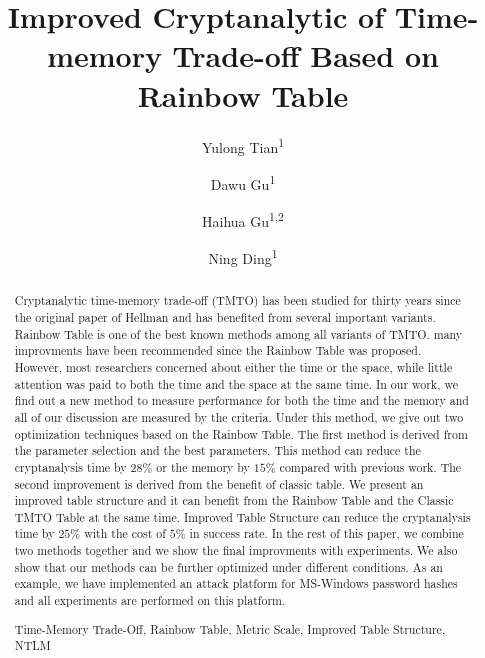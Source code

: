 \documentclass[runningheads,a4paper]{llncs}
\newcommand{\keywords}[1]{\par\addvspace\baselineskip
\noindent\keywordname\enspace\ignorespaces#1}
\begin{document}
\mainmatter  

\title{Improved Cryptanalytic of Time-memory Trade-off Based on Rainbow Table}


\author{Yulong Tian\textsuperscript{1} \and Dawu Gu\textsuperscript{1} \and Haihua Gu\textsuperscript{1,2}\and Ning Ding\textsuperscript{1}}

\maketitle


\begin{abstract}
Cryptanalytic time-memory trade-off (TMTO) has been studied for thirty years since the original paper of Hellman and has benefited from several important variants. Rainbow Table is one of the best known methods among all variants of TMTO. many improvments have been recommended since the Rainbow Table was proposed. However, most researchers concerned about either the time or the space, while little attention was paid to both the time and the space at the same time. In our work, we find out a new method to measure performance for both the time and the memory and all of our discussion are measured by the criteria. Under this method, we give out two optimization techniques based on the Rainbow Table. The first method is derived from the parameter selection and the best parameters. This method can reduce the cryptanalysis time by $28\%$ or the memory by $15\%$ compared with previous work. The second improvement is derived from the benefit of classic table. We present an improved table structure and it can benefit from the Rainbow Table and the Classic TMTO Table at the same time. Improved Table Structure can reduce the cryptanalysis time by $25\%$ with the cost of $5\%$ in success rate. In the rest of this paper, we combine two methods together and we show the final improvments with experiments. We also show that our methods can be further optimized under different conditions. As an example, we have implemented an attack platform for MS-Windows password hashes and all experiments are performed on this platform. 
\keywords{Time-Memory Trade-Off, Rainbow Table, Metric Scale, Improved Table Structure, NTLM}
\end{abstract}
\end{document}
